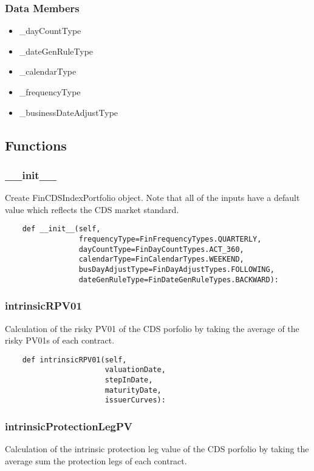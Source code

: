 \documentclass[twoside,11pt]{book}
\begin{document}
\subsubsection*{Data Members}
\begin{itemize}
\item{\_dayCountType}
\item{\_dateGenRuleType}
\item{\_calendarType}
\item{\_frequencyType}
\item{\_businessDateAdjustType}
\end{itemize}

\subsection*{Functions}

\subsubsection*{{\bf \_\_init\_\_}}
Create FinCDSIndexPortfolio object. Note that all of the inputs have a default value which reflects the CDS market standard.  

\begin{lstlisting}
    def __init__(self,
                 frequencyType=FinFrequencyTypes.QUARTERLY,
                 dayCountType=FinDayCountTypes.ACT_360,
                 calendarType=FinCalendarTypes.WEEKEND,
                 busDayAdjustType=FinDayAdjustTypes.FOLLOWING,
                 dateGenRuleType=FinDateGenRuleTypes.BACKWARD):
\end{lstlisting}

\subsubsection*{{\bf intrinsicRPV01}}
Calculation of the risky PV01 of the CDS porfolio by taking the average of the risky PV01s of each contract.  

\begin{lstlisting}
    def intrinsicRPV01(self,
                       valuationDate,
                       stepInDate,
                       maturityDate,
                       issuerCurves):
\end{lstlisting}

\subsubsection*{{\bf intrinsicProtectionLegPV}}
Calculation of the intrinsic protection leg value of the CDS porfolio by taking the average sum the protection legs of each contract.  
\end{document}
